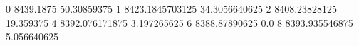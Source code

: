 0 8439.1875 50.30859375
1 8423.1845703125 34.3056640625
2 8408.23828125 19.359375
4 8392.076171875 3.197265625
6 8388.87890625 0.0
8 8393.935546875 5.056640625
